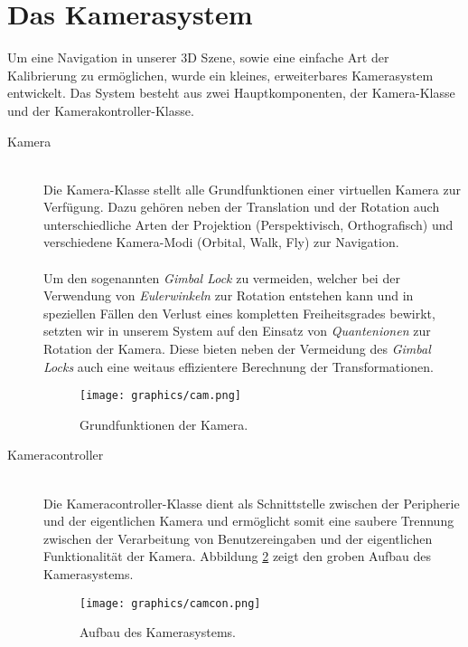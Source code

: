 \section{Das Kamerasystem}
\begin{Spacing}{\mylinespace}

Um eine Navigation in unserer 3D Szene, sowie eine einfache Art der Kalibrierung zu ermöglichen, wurde ein kleines, erweiterbares Kamerasystem entwickelt. Das System besteht aus zwei Hauptkomponenten, der Kamera-Klasse und der Kamerakontroller-Klasse.

\begin{description}
	\item[Kamera] \hfill \\
	Die Kamera-Klasse stellt alle Grundfunktionen einer virtuellen Kamera zur Verfügung. Dazu gehören neben der Translation und der Rotation auch unterschiedliche Arten der Projektion (Perspektivisch, Orthografisch) und verschiedene Kamera-Modi (Orbital, Walk, Fly) zur Navigation. \\\\
	Um den sogenannten \textit{Gimbal Lock} zu vermeiden, welcher bei der Verwendung von \textit{Eulerwinkeln} zur Rotation entstehen kann und in speziellen Fällen den Verlust eines kompletten Freiheitsgrades bewirkt, setzten wir in unserem System auf den Einsatz von \textit{Quantenionen} zur Rotation der Kamera. Diese bieten neben der Vermeidung des \textit{Gimbal Locks} auch eine weitaus effizientere Berechnung der Transformationen.   
	\begin{figure}[h!]
	\centering
	\vspace*{10px}
	\texttt{[image: graphics/cam.png]}
	\caption{Grundfunktionen der Kamera.}
	\label{fig:cam}
	\end{figure}
	\item[Kameracontroller] \hfill \\
	Die Kameracontroller-Klasse dient als Schnittstelle zwischen der Peripherie und der eigentlichen Kamera und ermöglicht somit eine saubere Trennung zwischen der Verarbeitung von Benutzereingaben und der eigentlichen Funktionalität der Kamera. Abbildung \ref{fig:Camerasystem} zeigt den groben Aufbau des Kamerasystems. 
	\begin{figure}[h!]
	\centering
	\vspace*{30px}
	\texttt{[image: graphics/camcon.png]}
	\caption{Aufbau des Kamerasystems.}
	\label{fig:Camerasystem}
	\end{figure}
\end{description}


\end{Spacing}
\newpage
\clearpage
